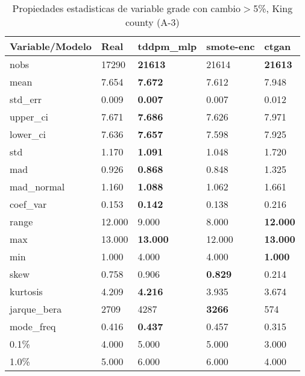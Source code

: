 \begin{table}[H]
\centering
\fontsize{8}{14}\selectfont
\caption{Propiedades estadisticas de variable grade con cambio\ensuremath{>}5\%, King county (A-3)}
\label{table-stats-king county-a-3-grade-short}
\begin{tabular}{|l|m{10em}|m{10em}|m{10em}|m{10em}|}
\hline
 \rowcolor[gray]{0.8}
Variable/Modelo & Real & tddpm\_mlp & smote-enc & ctgan \\
\hline nobs & 17290 & \bfseries 21613 & \cellcolor[rgb]{0.9, 0.54, 0.52} 21614 & \bfseries 21613 \\
\hline mean & 7.654 & \bfseries 7.672 & 7.612 & \cellcolor[rgb]{0.9, 0.54, 0.52} 7.948 \\
\hline std\_err & 0.009 & \bfseries 0.007 & 0.007 & \cellcolor[rgb]{0.9, 0.54, 0.52} 0.012 \\
\hline upper\_ci & 7.671 & \bfseries 7.686 & 7.626 & \cellcolor[rgb]{0.9, 0.54, 0.52} 7.971 \\
\hline lower\_ci & 7.636 & \bfseries 7.657 & 7.598 & \cellcolor[rgb]{0.9, 0.54, 0.52} 7.925 \\
\hline std & 1.170 & \bfseries 1.091 & 1.048 & \cellcolor[rgb]{0.9, 0.54, 0.52} 1.720 \\
\hline mad & 0.926 & \bfseries 0.868 & 0.848 & \cellcolor[rgb]{0.9, 0.54, 0.52} 1.325 \\
\hline mad\_normal & 1.160 & \bfseries 1.088 & 1.062 & \cellcolor[rgb]{0.9, 0.54, 0.52} 1.661 \\
\hline coef\_var & 0.153 & \bfseries 0.142 & 0.138 & \cellcolor[rgb]{0.9, 0.54, 0.52} 0.216 \\
\hline range & 12.000 & 9.000 & \cellcolor[rgb]{0.9, 0.54, 0.52} 8.000 & \bfseries 12.000 \\
\hline max & 13.000 & \bfseries 13.000 & \cellcolor[rgb]{0.9, 0.54, 0.52} 12.000 & \bfseries 13.000 \\
\hline min & 1.000 & \cellcolor[rgb]{0.9, 0.54, 0.52} 4.000 & \cellcolor[rgb]{0.9, 0.54, 0.52} 4.000 & \bfseries 1.000 \\
\hline skew & 0.758 & 0.906 & \bfseries 0.829 & \cellcolor[rgb]{0.9, 0.54, 0.52} 0.214 \\
\hline kurtosis & 4.209 & \bfseries 4.216 & 3.935 & \cellcolor[rgb]{0.9, 0.54, 0.52} 3.674 \\
\hline jarque\_bera & 2709 & 4287 & \bfseries 3266 & \cellcolor[rgb]{0.9, 0.54, 0.52} 574 \\
\hline mode\_freq & 0.416 & \bfseries 0.437 & 0.457 & \cellcolor[rgb]{0.9, 0.54, 0.52} 0.315 \\
\hline 0.1\% & 4.000 & 5.000 & 5.000 & 3.000 \\
\hline 1.0\% & 5.000 & 6.000 & 6.000 & 4.000 \\
\hline
\end{tabular}
\end{table}
